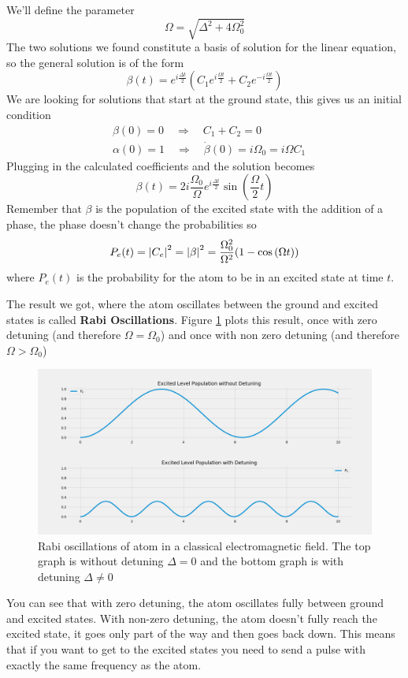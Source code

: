 We'll define the parameter
\[
    \Omega = \sqrt{\Delta^2 + 4\Omega_0^2}
\]
The two solutions we found constitute a basis of solution for the linear equation, so the general solution is of the form
\[
    \beta (t) = e^{i\frac{\Delta t}{2}} (C_1 e^{i \frac{\Omega t}{2}} + C_2 e^{-i \frac{\Omega t}{2}})
\]
We are looking for solutions that start at the ground state, this gives us an initial condition
\begin{align*}
    &\beta (0) = 0 \quad \Rightarrow \quad C_1 + C_2 = 0 \\
    &\alpha (0) = 1 \quad \Rightarrow \quad \dot{\beta} (0) = i \Omega_0 = i \Omega C_1
\end{align*}
Plugging in the calculated coefficients and the solution becomes
\[
    \beta (t) = 2 i \frac{\Omega_0}{\Omega}e^{i \frac{\Delta t}{2}} \sin{ (\frac{\Omega}{2}t)}
\]
Remember that $\beta$ is the population of the excited state with the addition of a phase, the phase doesn't change the probabilities so
\[
    P_e (t) = \abs{C_e}^2 = \abs{\beta}^2 = \frac{\Omega_0^2}{\Omega^2} (1 - \cos{ (\Omega t)})
\]
where $P_e (t)$ is the probability for the atom to be in an excited state at time $t$.

The result we got, where the atom oscillates between the ground and excited states is called \textbf{Rabi Oscillations}. Figure \ref{fig:rabi-oscillations} plots this result, once with zero detuning (and therefore $\Omega = \Omega_0$) and once with non zero detuning (and therefore $\Omega > \Omega_0$)
\begin{figure}[H]
    \centering
    \includegraphics[width=1.0\columnwidth]{Rabi-Oscillations.png}
    \caption{Rabi oscillations of atom in a classical electromagnetic field. The top graph is without detuning $\Delta = 0$ and the bottom graph is with detuning $\Delta \ne 0$}
    \label{fig:rabi-oscillations}
\end{figure}
You can see that with zero detuning, the atom oscillates fully between ground and excited states. With non-zero detuning, the atom doesn't fully reach the excited state, it goes only part of the way and then goes back down. This means that if you want  to get to the excited states you need to send a pulse with exactly the same frequency as the atom.

